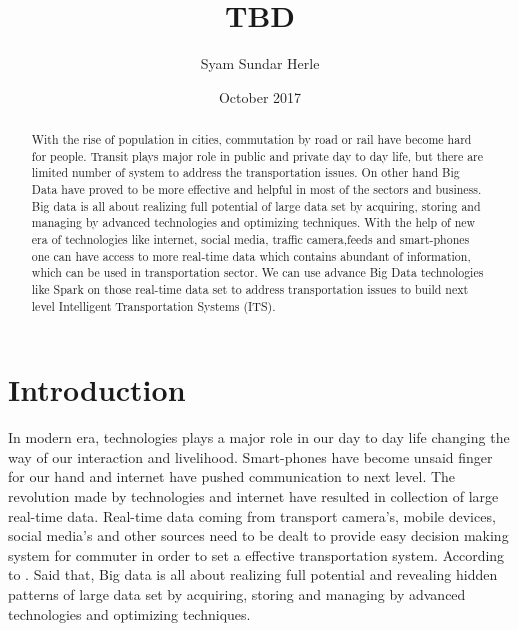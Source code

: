 \documentclass[sigconf]{acmart}
\begin{document}
\title{TBD}
 
 \author{Syam Sundar Herle}
 
 
 
 
 \date{October 2017}



\begin{abstract}

With the rise of population in cities, commutation by road or rail have become hard for people. Transit plays major role in public and private day to day life, but there are limited number of system to address the transportation issues. On other hand Big Data have proved to be more effective and helpful in most of the sectors and business. Big data is all about realizing full potential of large data set by acquiring, storing and managing by advanced technologies and optimizing techniques. With the help of new era of technologies like internet, social media, traffic camera,feeds and smart-phones one can have access to more real-time data which contains abundant of information, which can be used in transportation sector. We can use advance Big Data technologies like Spark on those real-time data set to address transportation issues to build next level Intelligent Transportation Systems (ITS). 

\end{abstract}


\maketitle

\section{Introduction}

In modern era, technologies plays a major role in our day to day life changing the way of our interaction and livelihood. Smart-phones have become unsaid finger for our hand and internet have pushed communication to next level. The revolution made by technologies and internet have resulted in collection of large real-time data. Real-time data coming from transport camera's, mobile devices, social media's and other sources need to be dealt to provide easy decision making system for commuter in order to set a effective transportation system. According to \cite{} . Said that, Big data is all about realizing full potential and revealing hidden patterns of large data set by acquiring, storing and managing by advanced technologies and optimizing techniques. 
\end{document}
